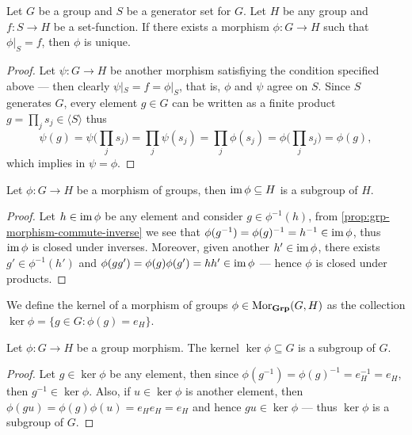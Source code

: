 \begin{proposition}
\label{prop:generator-unique-extension}
Let \(G\) be a group and \(S\) be a generator set for \(G\). Let \(H\) be any
group and \(f: S \to H\) be a set-function. If there exists a morphism \(\phi: G
\to H\) such that \(\phi|_S = f\), then \(\phi\) is unique.
\end{proposition}

\begin{proof}
Let \(\psi: G \to H\) be another morphism satisfiying the condition specified
above --- then clearly \(\psi|_S = f = \phi|_{S}\), that is, \(\phi\) and
\(\psi\) agree on \(S\). Since \(S\) generates \(G\), every element \(g \in G\)
can be written as a finite product \(g = \prod_{j} s_j \in \langle S \rangle\)
thus
\[
  \psi(g) = \psi\Big( \prod_j s_j \Big)
  = \prod_j \psi(s_j) = \prod_j \phi(s_j)
  = \phi\Big( \prod_j s_j \Big) = \phi(g),
\]
which implies in \(\psi = \phi\).
\end{proof}

\begin{proposition}
\label{prop:morphism-image-subgroup}
Let \(\phi: G \to H\) be a morphism of groups, then \(\operatorname{im} \phi \subseteq H\) is
a subgroup of \(H\).
\end{proposition}

\begin{proof}
Let \(h \in \operatorname{im} \phi\) be any element and consider \(g \in \phi^{-1}(h)\), from
\cref{prop:grp-morphism-commute-inverse} we see that \(\phi(g^{-1}) =
\phi(g)^{-1} = h^{-1} \in \operatorname{im} \phi\), thus \(\operatorname{im} \phi\) is closed under
inverses. Moreover, given another \(h' \in \operatorname{im} \phi\), there exists \(g' \in
\phi^{-1}(h')\) and \(\phi(g g') = \phi(g) \phi(g') = h h' \in \operatorname{im} \phi\) ---
hence \(\phi\) is closed under products.
\end{proof}

\begin{definition}[Kernel]
We define the kernel of a morphism of groups \(\phi \in \operatorname{Mor}_{\textbf{Grp}}(G, H)\) as
the collection \(\ker \phi = \{g \in G \colon \phi(g) = e_H\}\).
\end{definition}

\begin{lemma}
\label{lem:kernel-subgroup}
Let \(\phi: G \to H\) be a group morphism. The kernel \(\ker \phi \subseteq G\)
is a subgroup of \(G\).
\end{lemma}

\begin{proof}
Let \(g \in \ker \phi\) be any element, then since \(\phi(g^{-1}) = \phi(g)^{-1}
= e_H^{-1} = e_H\), then \(g^{-1} \in \ker \phi\). Also, if \(u \in \ker \phi\)
is another element, then \(\phi(g u) = \phi(g) \phi(u) = e_H e_H = e_H\) and
hence \(g u \in \ker \phi\) --- thus \(\ker \phi\) is a subgroup of \(G\).
\end{proof}

